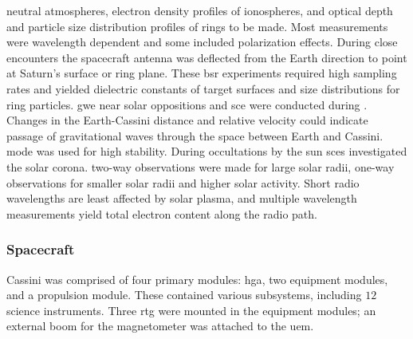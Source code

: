 \documentclass{article}
\begin{document}
                \glspl{neutral atmosphere},
                \glspl{electron density profile} of
                \glspl{ionosphere}, and \gls{optical depth}
                and \gls{particle size distribution} profiles
                of rings to be made. Most measurements were
                wavelength dependent and some included
                \gls{polarization} effects. During close
                encounters the spacecraft antenna was deflected
                from the Earth direction to point at Saturn's
                surface or ring plane. These
                \gls{bsr} experiments required high
                \glspl{sampling rate} and yielded dielectric
                constants of target surfaces and size
                distributions for ring particles. \gls{gwe}
                near \glspl{solar opposition} and \gls{sce}
                were conducted during
                .
                Changes in the Earth-Cassini distance and
                \gls{relative velocity} could indicate passage
                of gravitational waves through the space
                between Earth and Cassini.
                 mode
                was used for high stability. During
                \glspl{occultation} by the sun \glspl{sce}
                investigated the \gls{solar corona}.
                \Glspl{two-way observation} were made for
                large solar radii, \glspl{one-way observation}
                for smaller solar radii and higher solar
                activity. Short radio \glspl{wavelength} are
                least affected by \gls{solar plasma}, and
                multiple \gls{wavelength} measurements yield
                total \gls{electron} content along the
                \gls{radio path}.
            \subsubsection{Spacecraft}
                \label{subsubsec:usr_spacecraft}
                Cassini was comprised of four primary modules:
                \gls{hga}, two equipment modules, and a
                propulsion module. These contained various
                subsystems, including $12$ science instruments.
                Three \gls{rtg} were mounted in the equipment
                modules; an external boom for the magnetometer
                was attached to the \gls{uem}.
\end{document}
